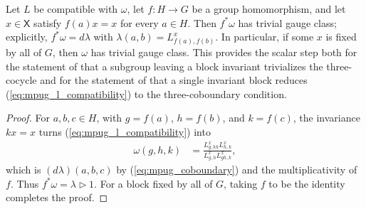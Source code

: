 \begin{lemma}
    \label{thm:mpug_fixed_block_trivializes}
    \leanok
    Let $L$ be compatible with $\omega$, let $f\colon H\to G$ be a group
    homomorphism, and let $x\in\mathsf X$ satisfy $f(a)x=x$ for every
    $a\in H$. Then $f^*\omega$ has trivial gauge class; explicitly,
    $f^*\omega=d\lambda$ with $\lambda(a,b)=L^x_{f(a),f(b)}$. In particular,
    if some $x$ is fixed by all of $G$, then $\omega$ has trivial gauge class.
    This provides the scalar step both for the statement of
    \cite[lines~740--745]{GarreRubio2023MPOSym} that a subgroup leaving a block
    invariant trivializes the three-cocycle and for the statement of
    \cite[line~1925]{FrancoRubio2025MPUGauging} that a single invariant block
    reduces (\ref{eq:mpug_l_compatibility}) to the three-coboundary condition.
\end{lemma}

\begin{proof}\leanok
    For $a,b,c\in H$, with $g=f(a)$, $h=f(b)$, and $k=f(c)$, the invariance
    $kx=x$ turns (\ref{eq:mpug_l_compatibility}) into
    \begin{align}
        \omega(g,h,k)
         & =\frac{L^x_{g,hk}L^x_{h,k}}{L^x_{g,h}L^x_{gh,k}},
    \end{align}
    which is $(d\lambda)(a,b,c)$ by (\ref{eq:mpug_coboundary}) and the
    multiplicativity of $f$. Thus
    $f^*\omega=\lambda\mathbin{\triangleright}1$. For a block fixed by all
    of $G$, taking $f$ to be the identity completes the proof.
\end{proof}

